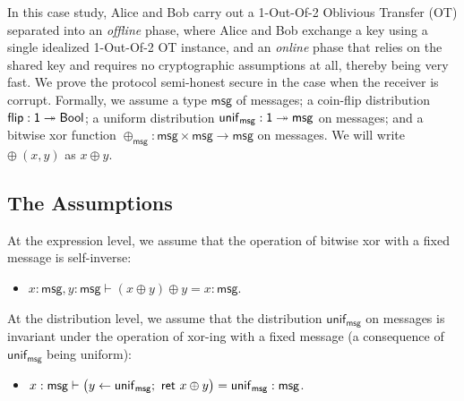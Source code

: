 \renewcommand{\msg}{\mathsf{msg}}
\newcommand{\flip}{\mathsf{flip}}
\renewcommand{\unif}{\mathsf{unif}}
\renewcommand{\id}{\mathsf{id}}
\renewcommand{\adv}{\mathsf{adv}}
\newcommand{\sen}{\mathsf{sen}}
\renewcommand{\rec}{\mathsf{rec}}
\newcommand{\ot}{\mathsf{ot}}
\renewcommand{\Msg}{\mathsf{Msg}}
\renewcommand{\Out}{\mathsf{Out}}
\newcommand{\Choice}{\mathsf{Choice}}
\newcommand{\OTMsg}{\mathsf{OTMsg}}
\newcommand{\OTOut}{\mathsf{OTOut}}
\newcommand{\OTChoice}{\mathsf{OTChoice}}
\newcommand{\Flip}{\mathsf{Flip}}
\renewcommand{\Key}{\mathsf{Key}}
\newcommand{\ChoiceEnc}{\mathsf{ChoiceEnc}}
\newcommand{\MsgEnc}{\mathsf{MsgEnc}}
\newcommand{\KeyPair}{\mathsf{KeyPair}}
\newcommand{\PrivateMsg}{\mathsf{PrivateMsg}}
\renewcommand{\LeakMsgRcvd}{\mathsf{MsgRcvd}}
\newcommand{\LeakOTMsgRcvd}{\mathsf{OTMsgRcvd}}
\newcommand{\LeakChoice}{\mathsf{Choice}}
\newcommand{\LeakOTChoice}{\mathsf{OTChoice}}
\newcommand{\LeakFlip}{\mathsf{Flip}}
\newcommand{\LeakOut}{\mathsf{Out}}
\newcommand{\LeakOTOut}{\mathsf{OTOut}}
\newcommand{\LeakChoiceEnc}{\mathsf{ChoiceEnc}}
\newcommand{\LeakMsgEnc}{\mathsf{MsgEnc}}

In this case study, Alice and Bob carry out a 1-Out-Of-2 Oblivious Transfer (OT) separated into an \emph{offline} phase, where Alice and Bob exchange a key using a single idealized 1-Out-Of-2 OT instance, and an \emph{online} phase that relies on the shared key and requires no cryptographic assumptions at all, thereby being very fast. We prove the protocol semi-honest secure in the case when the receiver is corrupt. Formally, we assume a type $\msg$ of messages; a coin-flip distribution $\flip : \one \twoheadrightarrow \Bool$; a uniform distribution $\unif_\msg : \one \twoheadrightarrow \msg$ on messages; and a bitwise xor function $\oplus_{\msg} : \msg \times \msg \rightarrow \msg$ on messages. We will write $\oplus \ (x,y)$ as $x \oplus y$.

\subsection{The Assumptions}
At the expression level, we assume that the operation of bitwise xor with a fixed message is self-inverse:
\begin{itemize}
\item $x : \msg, y : \msg \vdash (x \oplus y) \oplus y = x : \msg$.
\end{itemize}
At the distribution level, we assume that the distribution $\unif_\msg$ on messages is invariant under the operation of xor-ing with a fixed message (a consequence of $\unif_\msg$ being uniform):
\begin{itemize}
\item $x : \msg \vdash \big(y \leftarrow \unif_\msg; \ \ret{x \oplus y}\big) = \unif_\msg : \msg$.
\end{itemize}

